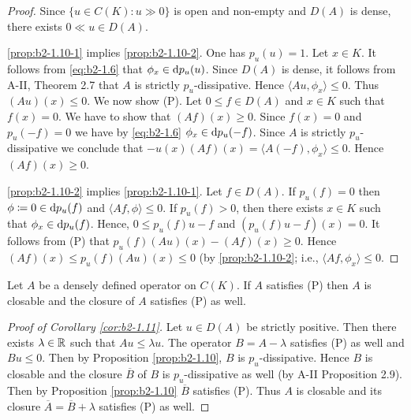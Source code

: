 \begin{proof}
Since $\{u \in C(K) \colon u \gg 0\}$ is open and non-empty and $D(A)$ is dense, there exists $0 \ll u \in D(A)$.

\ref{prop:b2-1.10-1} implies  \ref{prop:b2-1.10-2}.
One has $p_{u}(u) = 1$.
Let $x \in K$.
It follows from \eqref{eq:b2-1.6} that $\phi_{x} \in \mathop{}\!\mathrm{d}{p}_{u}(u)$.
Since $D(A)$ is dense, it follows from A-II, Theorem 2.7
that $A$ is strictly $p_{u}$-dissipative.
Hence $\langle Au,\phi_{x} \rangle \leq 0$.
Thus $(Au)(x) \leq 0$.
We now show (P).
Let $0 \leq f \in D(A)$ and $x \in K$ such that $f(x) = 0$.
We have to show that $(Af)(x) \geq 0$.
Since $f(x) = 0$ and $p_{u}(-f) = 0$ we have by \eqref{eq:b2-1.6} $\phi_{x} \in \mathop{}\!\mathrm{d}{p}_{u}(-f)$.
Since $A$ is strictly $p_{u}$-dissipative we conclude that $-u(x)(Af)(x) = \langle A(-f),\phi_{x} \rangle \leq 0$.
Hence $(Af)(x) \geq 0$.

\ref{prop:b2-1.10-2} implies \ref{prop:b2-1.10-1}.
Let $f \in D(A)$.
If $p_{u}(f) = 0$ then $\phi \coloneqq 0 \in \mathop{}\!\mathrm{d}{p}_{u}(f)$ and $\langle Af,\phi \rangle \leq 0$.
If $p_{u}(f) > 0$, then there exists $x \in K$ such that $\phi_{x} \in \mathop{}\!\mathrm{d}{p}_{u}(f)$.
Hence, $0 \leq p_{u}(f)u - f$ and $(p_{u}(f)u - f)(x) = 0$.
It follows from (P) that $p_{u}(f)(Au)(x) - (Af)(x) \geq 0$.
Hence $(Af)(x) \leq p_{u}(f)(Au)(x) \leq 0$ (by \ref{prop:b2-1.10-2}; i.e., $\langle Af,\phi_{x} \rangle \leq 0$.
\end{proof}

\begin{corollary}\label{cor:b2-1.11}
Let $A$ be a densely defined operator on $C(K)$.
If $A$ satisfies (P) then $A$ is closable and the closure of $A$ satisfies (P) as well.
\end{corollary}
\begin{proof}[Proof of Corollary \ref{cor:b2-1.11}]
Let $u \in D(A)$ be strictly positive.
Then there exists $\lambda \in \mathbb{R}$ such that $Au \leq \lambda u$.
The operator $B = A - \lambda$ satisfies (P) as well and $Bu \leq 0$.
Then by Proposition \ref{prop:b2-1.10}, $B$ is $p_{u}$-dissipative.
Hence $B$ is closable and the closure $\overline{B}$ of $B$ is $p_{u}$-dissipative as well (by A-II Proposition 2.9).
Then by Proposition \ref{prop:b2-1.10} $\overline{B}$ satisfies (P).
Thus $A$ is closable and its closure $\overline{A} = \overline{B} + \lambda$ satisfies (P) as well.
\end{proof}

